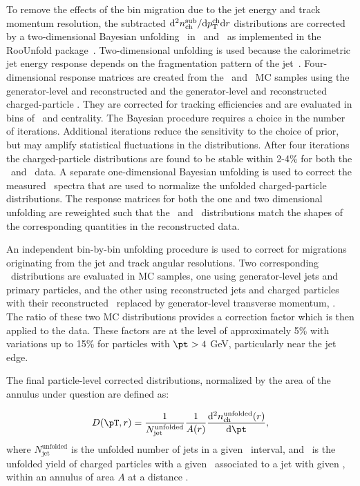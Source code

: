 To remove the effects of the bin migration due to the jet energy and track momentum resolution, the subtracted $\mathrm{d}^2 \mbox{$n_{\mathrm{ch}}^{\mathrm{sub}}$} /\mathrm{d}\mbox{$p_{\mathrm{T}}^{\mathrm{ch}}$} \mathrm{d} r$ distributions are corrected by a two-dimensional Bayesian unfolding~\cite{DAgostini:1994zf} in \pttrk\ and \ptjet\ as implemented in the RooUnfold package~\cite{Adye:2011gm}.
Two-dimensional unfolding is used because the calorimetric jet energy response depends on the fragmentation pattern of the jet~\cite{Aad:2011he}.
Four-dimensional response matrices are created from the \pp\ and \pbpb\ MC samples using the generator-level and reconstructed \ptjet and the generator-level and reconstructed charged-particle \pttrk.
They are corrected for tracking efficiencies and are evaluated in bins of \rvar\ and centrality.
The Bayesian procedure requires a choice in the number of iterations.
Additional iterations reduce the sensitivity to the choice of prior, but may amplify statistical fluctuations in the distributions.
After four iterations the charged-particle distributions are found to be stable within 2-4\% for both the \PbPb\ and \pp\ data.
A separate one-dimensional Bayesian unfolding is used to correct the measured \ptjet\ spectra that are used to normalize the unfolded charged-particle distributions.
The response matrices for both the one and two dimensional unfolding are reweighted such that the \Dptr\ and \ptjet\ distributions match the shapes of the corresponding quantities in the reconstructed data.

An independent bin-by-bin unfolding procedure is used to correct for migrations originating from the jet and track angular resolutions.
Two corresponding \Dptr\ distributions are evaluated in MC samples, one using generator-level jets and primary particles, and the other using reconstructed jets and charged particles with their reconstructed \pt\ replaced by generator-level transverse momentum, \pTtrue.
The ratio of these two MC distributions provides a correction factor which is then applied to the data.
These factors are at the level of approximately 5\% with variations up to 15\% for particles with $\pt > 4$ GeV, particularly near the jet edge.


The final particle-level corrected distributions, normalized by the area of the annulus under question are defined as:

\begin{align*}
   \Dptr = \frac{1}{N_\mathrm{jet}^\mathrm{unfolded}} \frac{1}{A(r)} \frac{\fd^2 \nchunf(r)}{\fd \pt},
 \end{align*}
where $N_\mathrm{jet}^\mathrm{unfolded}$ is the unfolded number of jets in a given \ptjet\ interval, and \nchunf\  is the unfolded yield of charged particles with a given \pt\ associated to a jet with given \ptjet, within an annulus of area $A$ at a distance \rvar.

